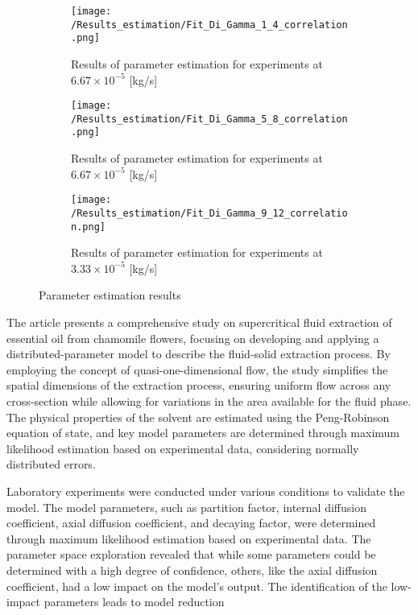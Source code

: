 \documentclass[a4paper,fleqn]{cas-dc}
\begin{document}
\begin{figure*}[!h]
	\centering
	\begin{subfigure}{0.3\textwidth}
		\centering
		\texttt{[image: /Results\_estimation/Fit\_Di\_Gamma\_1\_4\_correlation.png]}
		\caption{Results of parameter estimation for experiments at $6.67\times 10^{-5}$ [kg/s]}%
		\label{fig: Fit_1_4_Di_Gamma_correlation}
	\end{subfigure}
	\hfill
	\begin{subfigure}{0.3\textwidth}
		\centering
		\texttt{[image: /Results\_estimation/Fit\_Di\_Gamma\_5\_8\_correlation.png]}
		\caption{Results of parameter estimation for experiments at $6.67\times 10^{-5}$ [kg/s]}%
		\label{fig: Fit_5_8_Di_Gamma_correlation}
	\end{subfigure}
	\hfill
	\begin{subfigure}{0.3\textwidth}
		\centering
		\texttt{[image: /Results\_estimation/Fit\_Di\_Gamma\_9\_12\_correlation.png]}
		\caption{Results of parameter estimation for experiments at $3.33\times 10^{-5}$ [kg/s]}
		\label{fig: Fit_9_12_Di_Gamma_correlation}
	\end{subfigure}
	\caption{Parameter estimation results}
	\label{fig: Fit_Di_Gamma_correlation}
\end{figure*}

The article presents a comprehensive study on supercritical fluid extraction of essential oil from chamomile flowers, focusing on developing and applying a distributed-parameter model to describe the fluid-solid extraction process. By employing the concept of quasi-one-dimensional flow, the study simplifies the spatial dimensions of the extraction process, ensuring uniform flow across any cross-section while allowing for variations in the area available for the fluid phase. The physical properties of the solvent are estimated using the Peng-Robinson equation of state, and key model parameters are determined through maximum likelihood estimation based on experimental data, considering normally distributed errors.

Laboratory experiments were conducted under various conditions to validate the model. The model parameters, such as partition factor, internal diffusion coefficient, axial diffusion coefficient, and decaying factor, were determined through maximum likelihood estimation based on experimental data. The parameter space exploration revealed that while some parameters could be determined with a high degree of confidence, others, like the axial diffusion coefficient, had a low impact on the model's output. The identification of the low-impact parameters leads to model reduction
\end{document}
